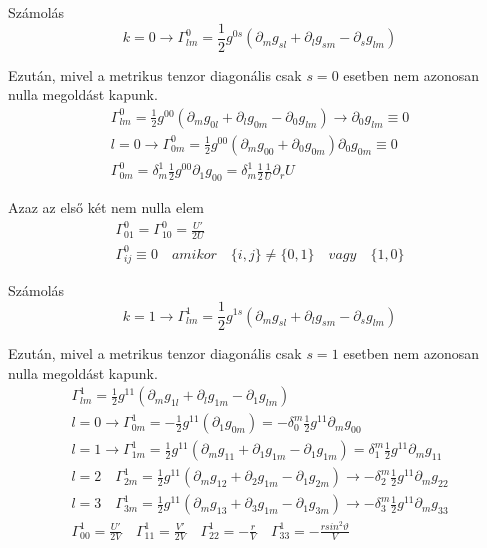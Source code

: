 \documentclass[10pt]{beamer}
\begin{document}
\begin{frame}[t]{Számolás}
$$k = 0 \rightarrow \Gamma_{lm}^{0} = \frac{1}{2}g^{0s}(\partial_{m}g_{sl} + \partial_{l}g_{sm} - \partial_{s}g_{lm})$$
\par Ezután, mivel a metrikus tenzor diagonális csak $s = 0$ esetben nem azonosan nulla megoldást kapunk.
\begin{gather*}
\Gamma_{lm}^{0} = \frac{1}{2}g^{00}(\partial_{m}g_{0l} + \partial_{l}g_{0m} - \partial_{0}g_{lm}) \rightarrow \partial_{0}g_{lm} \equiv 0 \\
l = 0 \rightarrow \Gamma_{0m}^{0} = \frac{1}{2}g^{00}(\partial_{m}g_{00} + \partial_{0}g_{0m}) \partial_{0}g_{0m} \equiv 0 \\
\Gamma_{0m}^{0} = \delta_{m}^{1}\frac{1}{2}g^{00}\partial_{1}g_{00} = \delta_{m}^{1}\frac{1}{2}\frac{1}{U}\partial_{r}U
\end{gather*}
\par Azaz az első két nem nulla elem 
\begin{gather*}
\Gamma_{01}^{0} = \Gamma_{10}^{0} = \frac{U'}{2U} \\
\Gamma_{ij}^{0} \equiv 0 \quad amikor \quad \{i,j\} \neq \{0,1\} \quad vagy \quad \{1,0\}
\end{gather*}
\end{frame}

\begin{frame}[t]{Számolás}
$$k = 1 \rightarrow \Gamma_{lm}^{1} = \frac{1}{2}g^{1s}(\partial_{m}g_{sl} + \partial_{l}g_{sm} - \partial_{s}g_{lm})$$
\par Ezután, mivel a metrikus tenzor diagonális csak $s = 1$ esetben nem azonosan nulla megoldást kapunk.
\begin{gather*}
\Gamma_{lm}^{1} = \frac{1}{2}g^{11}(\partial_{m}g_{1l} + \partial_{l}g_{1m} - \partial_{1}g_{lm}) \\
l = 0 \rightarrow \Gamma_{0m}^{1} = -\frac{1}{2}g^{11}(\partial_{1}g_{0m}) = 
-\delta_{0}^{m}\frac{1}{2}g^{11}\partial_{m}g_{00} \\
l = 1 \rightarrow \Gamma_{1m}^{1} = \frac{1}{2}g^{11}(\partial_{m}g_{11} + \partial_{1}g_{1m} - \partial_{1}g_{1m}) = \delta_{1}^{m}
\frac{1}{2}g^{11}\partial_{m}g_{11} \\
l = 2 \quad \Gamma_{2m}^{1} = \frac{1}{2}g^{11}(\partial_{m}g_{12} + \partial_{2}g_{1m} - \partial_{1}g_{2m}) \rightarrow
-\delta_{2}^{m}\frac{1}{2}g^{11}\partial_{m}g_{22} \\
l = 3 \quad \Gamma_{3m}^{1} = \frac{1}{2}g^{11}(\partial_{m}g_{13} + \partial_{3}g_{1m} - \partial_{1}g_{3m}) \rightarrow
-\delta_{3}^{m}\frac{1}{2}g^{11}\partial_{m}g_{33}\\
 \Gamma_{00}^{1} = \frac{U'}{2V} \quad \Gamma_{11}^{1} = \frac{V'}{2V} \quad \Gamma_{22}^{1} = -\frac{r}{V} \quad \Gamma_{33}^{1}=-\frac{rsin^{2}\vartheta}{V} \\
\end{gather*}
\end{frame}
\end{document}
